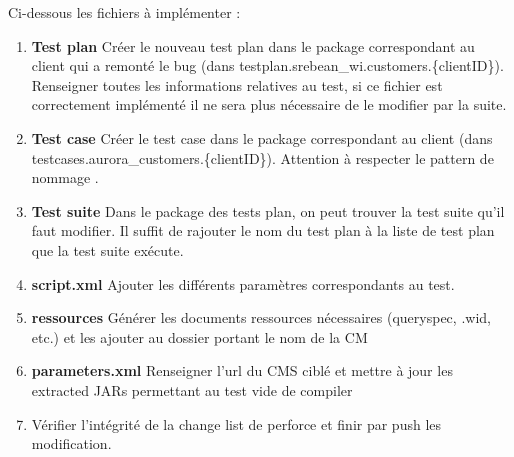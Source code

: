 Ci-dessous les fichiers à implémenter :\\
\begin{enumerate}
	\item \textbf{Test plan} Créer le nouveau test plan dans le package correspondant au client qui a remonté le bug (dans testplan.srebean\_wi.customers.\{clientID\}). Renseigner toutes les informations relatives au test, si ce fichier est correctement implémenté il ne sera plus nécessaire de le modifier par la suite.
	\item \textbf{Test case} Créer le test case dans le package correspondant au client (dans testcases.aurora\_customers.\{clientID\}). Attention à respecter le pattern de nommage .
	\item \textbf{Test suite} Dans le package des tests plan, on peut trouver la test suite qu'il faut modifier. Il suffit de rajouter le nom du test plan à la liste de test plan que la test suite exécute.
	\item \textbf{script.xml} Ajouter les différents paramètres correspondants au test.
	\item \textbf{ressources} Générer les documents ressources nécessaires (queryspec, .wid, etc.) et les ajouter au dossier portant le nom de la CM
	\item \textbf{parameters.xml} Renseigner l'url du CMS ciblé et mettre à jour les extracted JARs permettant au test vide de compiler
	\item Vérifier l'intégrité de la change list de perforce et finir par push les modification.
\end{enumerate}


